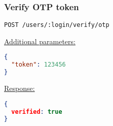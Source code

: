 %
%
%
%
%
%
%


\subsubsection{Verify OTP token}

\begin{lstlisting}[language=http_request]
POST /users/:login/verify/otp
\end{lstlisting}

{\tiny \underline{Additional parameters:}}
\begin{lstlisting}[language=json, numbers=none]
{
  "token": 123456
}
\end{lstlisting}


{\tiny \underline{Response:}}
\begin{lstlisting}[language=json, numbers=none]
{
  verified: true
}
\end{lstlisting}
